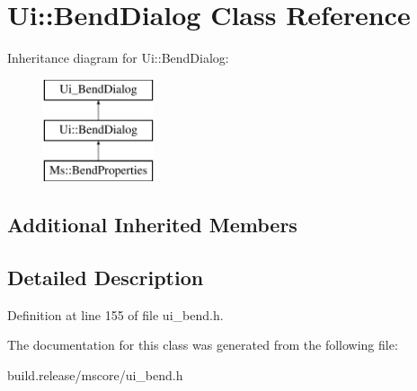 \hypertarget{class_ui_1_1_bend_dialog}{}\section{Ui\+:\+:Bend\+Dialog Class Reference}
\label{class_ui_1_1_bend_dialog}
Inheritance diagram for Ui\+:\+:Bend\+Dialog\+:\begin{figure}[H]
\begin{center}
\leavevmode
\includegraphics[height=3.000000cm]{class_ui_1_1_bend_dialog}
\end{center}
\end{figure}
\subsection*{Additional Inherited Members}


\subsection{Detailed Description}


Definition at line 155 of file ui\+\_\+bend.\+h.



The documentation for this class was generated from the following file\+:\begin{DoxyCompactItemize}
\item 
build.\+release/mscore/ui\+\_\+bend.\+h\end{DoxyCompactItemize}

